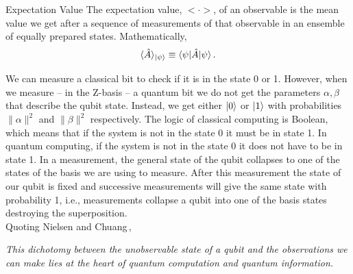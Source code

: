 \begin{definition}{Expectation Value}{}
    The expectation value, $<\cdot>$, of an observable is the mean value we get after a sequence of measurements of that observable in an ensemble of equally prepared states.
        Mathematically,
    \begin{equation}
        \langle\hat{A}\rangle_{\ket{\psi}} \equiv \braket{\psi |\hat{A}| \psi}.
    \end{equation}
\end{definition}
We can measure a classical bit to check if it is in the state 0 or 1. However, when we measure -- in the Z-basis -- a quantum bit we do not get the parameters $\alpha, \beta$ that describe the qubit state. Instead, we get either $\ket{0}$ or $\ket{1}$ with probabilities $\|\alpha\|^{2}$ and $\|\beta\|^{2}$ respectively. The logic of classical computing is Boolean, which means that if the system is not in the state 0 it must be in state 1. In quantum computing, if the system is not in the state 0 it does not have to be in state 1.   
In a measurement, the general state of the qubit collapses to one of the states of the basis we are using to measure. After this measurement the state of our qubit is fixed and successive measurements will give the same state with probability 1, i.e., measurements collapse a qubit into one of the basis states destroying the superposition.\\
Quoting Nielsen and Chuang\,\cite{Nielsen2010QuantumInformation},
\begin{displayquote}
\textit{This dichotomy between the unobservable state of a qubit and the observations we can make lies at the heart of quantum computation and quantum information.}
\end{displayquote}
